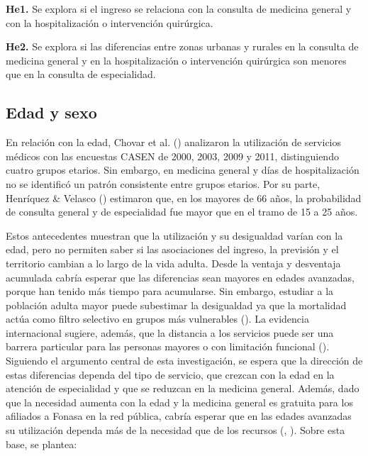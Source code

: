 \documentclass[
  spanish,
  a4paper,
  oneside]{scrbook}
\begin{document}
\textbf{He1.} Se explora si el ingreso se relaciona con la consulta de
medicina general y con la hospitalización o intervención quirúrgica.

\textbf{He2.} Se explora si las diferencias entre zonas urbanas y
rurales en la consulta de medicina general y en la hospitalización o
intervención quirúrgica son menores que en la consulta de especialidad.

\subsection{Edad y sexo}\label{edad-y-sexo}

En relación con la edad, Chovar et al.
() analizaron la
utilización de servicios médicos con las encuestas CASEN de 2000, 2003,
2009 y 2011, distinguiendo cuatro grupos etarios. Sin embargo, en
medicina general y días de hospitalización no se identificó un patrón
consistente entre grupos etarios. Por su parte, Henríquez \& Velasco
() estimaron que, en
los mayores de 66 años, la probabilidad de consulta general y de
especialidad fue mayor que en el tramo de 15 a 25 años.

Estos antecedentes muestran que la utilización y su desigualdad varían
con la edad, pero no permiten saber si las asociaciones del ingreso, la
previsión y el territorio cambian a lo largo de la vida adulta. Desde la
ventaja y desventaja acumulada cabría esperar que las diferencias sean
mayores en edades avanzadas, porque han tenido más tiempo para
acumularse. Sin embargo, estudiar a la población adulta mayor puede
subestimar la desigualdad ya que la mortalidad actúa como filtro
selectivo en grupos más vulnerables
(). La
evidencia internacional sugiere, además, que la distancia a los
servicios puede ser una barrera particular para las personas mayores o
con limitación funcional
(). Siguiendo el argumento central de esta investigación, se espera
que la dirección de estas diferencias dependa del tipo de servicio, que
crezcan con la edad en la atención de especialidad y que se reduzcan en
la medicina general. Además, dado que la necesidad aumenta con la edad y
la medicina general es gratuita para los afiliados a Fonasa en la red
pública, cabría esperar que en las edades avanzadas su utilización
dependa más de la necesidad que de los recursos
(,
). Sobre esta base, se
plantea:
\end{document}
